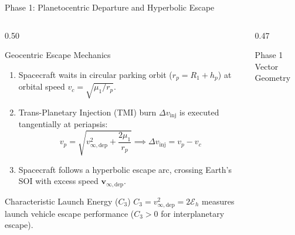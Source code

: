 \documentclass[aspectratio=169, 10pt]{beamer}
\begin{document}
\begin{frame}{Phase 1: Planetocentric Departure and Hyperbolic Escape}
    \begin{columns}[t]
        \begin{column}{0.50\textwidth}
            \begin{block}{Geocentric Escape Mechanics}
                \scriptsize
                \begin{enumerate}\setlength{\itemsep}{2pt}\setlength{\topsep}{1pt}
                    \item Spacecraft waits in circular parking orbit ($r_p = R_1 + h_p$) at orbital speed $v_c = \sqrt{\mu_1 / r_p}$.
                    \item Trans-Planetary Injection (TMI) burn $\Delta v_{\text{inj}}$ is executed tangentially at periapsis:
                    \vspace{-0.08cm}
                    \begin{equation*}
                        v_p = \sqrt{v_{\infty,\text{dep}}^2 + \frac{2\mu_1}{r_p}} \implies \Delta v_{\text{inj}} = v_p - v_c
                    \end{equation*}
                    \vspace{-0.15cm}
                    \item Spacecraft follows a hyperbolic escape arc, crossing Earth's SOI with excess speed $\mathbf{v}_{\infty,\text{dep}}$.
                \end{enumerate}
            \end{block}

            \vspace{-0.1cm}

            \begin{exampleblock}{Characteristic Launch Energy ($C_3$)}
                \scriptsize
                $C_3 = v_{\infty,\text{dep}}^2 = 2\mathcal{E}_h$ measures launch vehicle escape performance ($C_3 > 0$ for interplanetary escape).
            \end{exampleblock}
        \end{column}

        \begin{column}{0.47\textwidth}
            \begin{block}{Phase 1 Vector Geometry}
                \centering
\end{block}
\end{column}
\end{columns}
\end{frame}
\end{document}
